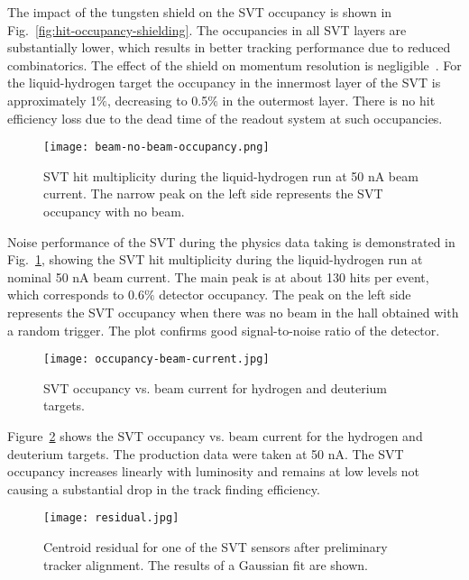 The impact of the tungsten shield on the SVT occupancy is shown in Fig.~\ref{fig:hit-occupancy-shielding}. The occupancies in all SVT layers are substantially lower, which results in better tracking performance due to reduced combinatorics. The effect of the shield on momentum resolution is negligible~\cite{SHIELDNOTE}. For the liquid-hydrogen target the occupancy in the innermost layer of the SVT is approximately 1$\%$, decreasing to 0.5$\%$ in the outermost layer. There is no hit efficiency loss due to the dead time of the readout system at such occupancies.

\begin{figure}[hbt] 
\centering 
\texttt{[image: beam-no-beam-occupancy.png]}
\caption{SVT hit multiplicity during the liquid-hydrogen run at 50 nA beam current. The narrow peak on the left side represents the SVT occupancy with no beam.}
\label{fig:beam-no-beam-occupancy}
\end{figure}

Noise performance of the SVT during the physics data taking is demonstrated in Fig.~\ref{fig:beam-no-beam-occupancy}, showing the SVT hit multiplicity during the liquid-hydrogen run at nominal 50 nA beam current. The main peak is at about 130 hits per event, which corresponds to 0.6$\%$ detector occupancy. The peak on the left side represents the SVT occupancy when there was no beam in the hall obtained with a random trigger. The plot confirms good signal-to-noise ratio of the detector. 

\begin{figure}[hbt] 
\centering 
\texttt{[image: occupancy-beam-current.jpg]}
\caption{SVT occupancy vs. beam current for hydrogen and deuterium targets.}
\label{fig:occupancy-beam-current}
\end{figure}

Figure~\ref{fig:occupancy-beam-current} shows the SVT occupancy vs. beam current for the hydrogen and deuterium targets. The production data were taken at 50 nA. The SVT occupancy increases linearly with luminosity and remains at low levels not causing a substantial drop in the track finding efficiency.

\begin{figure}[hbt] 
\centering 
\texttt{[image: residual.jpg]}
\caption{Centroid residual for one of the SVT sensors after preliminary tracker alignment. The results of a Gaussian fit are shown.}
\label{fig:residual}
\end{figure}

